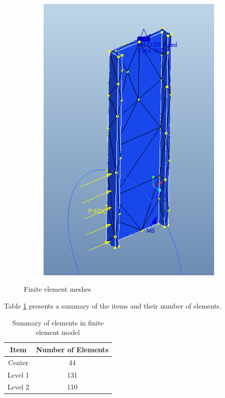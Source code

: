 \documentclass[12pt,letterpaper]{report}
\begin{document}
\begin{figure}[H]
\begin{subfigure}{.3\textwidth}
				\includegraphics[width=\textwidth]{L2MeshCrop}
				\label{fig:L2Mesh}
			\end{subfigure}
			\caption{Finite element meshes}
		\end{figure}
		\graphicspath{ {..} }
		
		Table \ref{tab:SummarOfElements} presents a summary of the items and their number of elements.
		
		\begin{table}[H]
			\centering
			\begin{tabular}{|c|c|}
			\hline \textbf{Item} & \textbf{Number of Elements}\\
			\hline Center & 44\\
			\hline Level 1 & 131\\
			\hline Level 2 & 110\\
			\hline
			\end{tabular}
			\caption{Summary of elements in finite element model}
			\label{tab:SummarOfElements}
		\end{table}
		
\end{document}
